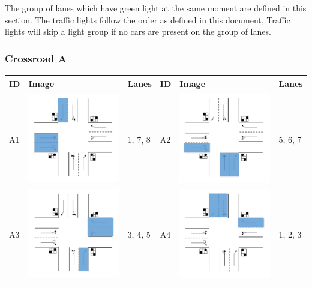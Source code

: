 The group of lanes which have green light at the same moment are defined in this section. The traffic lights follow the order as defined in this document, Traffic lights will skip a light group if no cars are present on the group of lanes.

\subsubsection{Crossroad A}
\begin{tabularx}{\textwidth}{|p{0.6cm}p{4cm}X|p{0.6cm}p{4cm}X|}\hline
	ID & Image & Lanes & ID & Image & Lanes \\\hline
	A1 &  \includegraphics[width=4cm]{figures/CrossroadA1.pdf} & 1, 7, 8 &
	A2 &  \includegraphics[width=4cm]{figures/CrossroadA2.pdf} & 5, 6, 7 \\\hline
	A3 &  \includegraphics[width=4cm]{figures/CrossroadA3.pdf} & 3, 4, 5 &
	A4 &  \includegraphics[width=4cm]{figures/CrossroadA4.pdf} & 1, 2, 3 \\\hline
\end{tabularx}

